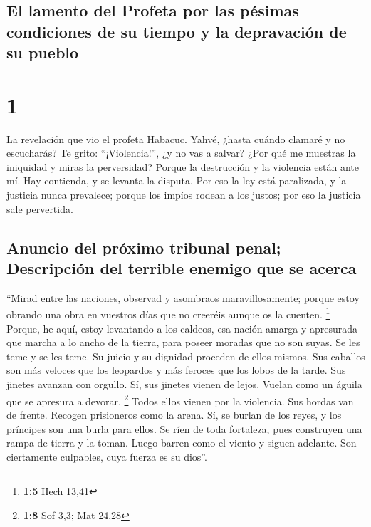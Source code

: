 \hypertarget{el-lamento-del-profeta-por-las-puxe9simas-condiciones-de-su-tiempo-y-la-depravaciuxf3n-de-su-pueblo}{%
\subsection{El lamento del Profeta por las pésimas condiciones de su
tiempo y la depravación de su
pueblo}\label{el-lamento-del-profeta-por-las-puxe9simas-condiciones-de-su-tiempo-y-la-depravaciuxf3n-de-su-pueblo}}

\hypertarget{section}{%
\section{1}\label{section}}

 La revelación que vio el profeta Habacuc. 
Yahvé, ¿hasta cuándo clamaré y no escucharás? Te grito: ``¡Violencia!'',
¿y no vas a salvar?  ¿Por qué me muestras la iniquidad y
miras la perversidad? Porque la destrucción y la violencia están ante
mí. Hay contienda, y se levanta la disputa.  Por eso la
ley está paralizada, y la justicia nunca prevalece; porque los impíos
rodean a los justos; por eso la justicia sale pervertida.

\hypertarget{anuncio-del-pruxf3ximo-tribunal-penal-descripciuxf3n-del-terrible-enemigo-que-se-acerca}{%
\subsection{Anuncio del próximo tribunal penal; Descripción del terrible
enemigo que se
acerca}\label{anuncio-del-pruxf3ximo-tribunal-penal-descripciuxf3n-del-terrible-enemigo-que-se-acerca}}

 ``Mirad entre las naciones, observad y asombraos
maravillosamente; porque estoy obrando una obra en vuestros días que no
creeréis aunque os la cuenten. \footnote{\textbf{1:5} Hech 13,41}
 Porque, he aquí, estoy levantando a los caldeos, esa
nación amarga y apresurada que marcha a lo ancho de la tierra, para
poseer moradas que no son suyas.  Se les teme y se les
teme. Su juicio y su dignidad proceden de ellos mismos. 
Sus caballos son más veloces que los leopardos y más feroces que los
lobos de la tarde. Sus jinetes avanzan con orgullo. Sí, sus jinetes
vienen de lejos. Vuelan como un águila que se apresura a devorar.
\footnote{\textbf{1:8} Sof 3,3; Mat 24,28}  Todos ellos
vienen por la violencia. Sus hordas van de frente. Recogen prisioneros
como la arena.  Sí, se burlan de los reyes, y los
príncipes son una burla para ellos. Se ríen de toda fortaleza, pues
construyen una rampa de tierra y la toman.  Luego barren
como el viento y siguen adelante. Son ciertamente culpables, cuya fuerza
es su dios''.

